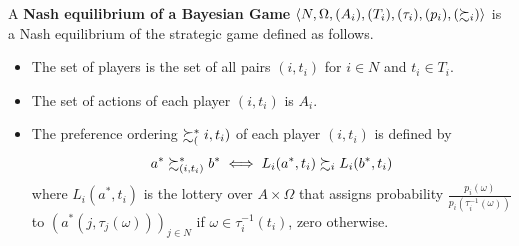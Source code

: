 \documentclass[11pt]{article}
\begin{document}
			\begin{definition}
				A \textbf{Nash equilibrium of a Bayesian Game} $\langle N, \Omega, (A_i), (T_i), (\tau_i), (p_i), (\succsim_i) \rangle$ is a Nash equilibrium of the strategic game defined as follows.
				\begin{itemize}
					\item The set of players is the set of all pairs $(i, t_i)$ for $i \in N$ and $t_i \in T_i$.
					\item The set of actions of each player $(i, t_i)$ is $A_i$.
					\item The preference ordering $\succsim^*_(i, t_i)$ of each player $(i, t_i)$ is defined by
					\begin{equation}
						a^* \succsim^*_{(i, t_i)} b^* \iff L_i(a^*, t_i) \succsim_i L_i(b^*, t_i)
					\end{equation}
					where $L_i(a^*, t_i)$ is the lottery over $A \times \Omega$ that assigns probability
					$
						\frac{p_i(\omega)}{p_i(\tau_i^{-1}(\omega))}
					$
					to $(a^*(j, \tau_j(\omega)))_{j\in N}$ if $\omega \in \tau_i^{-1}(t_i)$, zero otherwise.
				\end{itemize}
			\end{definition}
\end{document}
